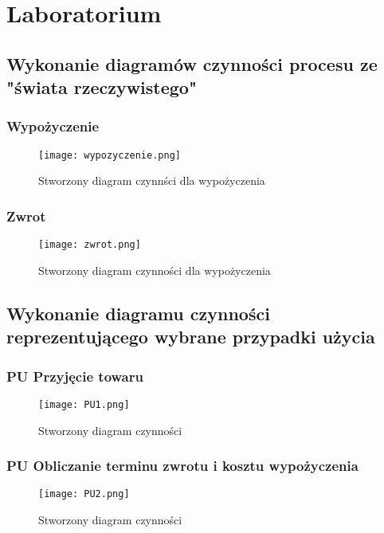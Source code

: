 \documentclass{article}
\begin{document}
	\section{Laboratorium}
	\subsection{Wykonanie diagramów czynności procesu ze "świata rzeczywistego"}
	\subsubsection{Wypożyczenie}
	\begin{figure}[!ht]
	\centering
	\texttt{[image: wypozyczenie.png]}
	\caption{Stworzony diagram czynnści dla wypożyczenia}
	\label{fig:obrazek 1}
	\end{figure}

\newpage
	\subsubsection{Zwrot}
\begin{figure}[!ht]
	\centering
	\texttt{[image: zwrot.png]}
	\caption{Stworzony diagram czynności dla wypożyczenia}
	\label{fig:obrazek 2}
\end{figure}
	\newpage
	\subsection{Wykonanie diagramu czynności reprezentującego wybrane przypadki użycia}
\subsubsection{PU Przyjęcie towaru}
\begin{figure}[!ht]
	\centering
	\texttt{[image: PU1.png]}
	\caption{Stworzony diagram czynności}
	\label{fig:obrazek 3}
\end{figure}
\newpage
\subsubsection{PU Obliczanie terminu zwrotu i kosztu wypożyczenia}	
\begin{figure}[!ht]
	\centering
	\texttt{[image: PU2.png]}
	\caption{Stworzony diagram czynności}
	\label{fig:obrazek 4}
\end{figure}	
\end{document}
